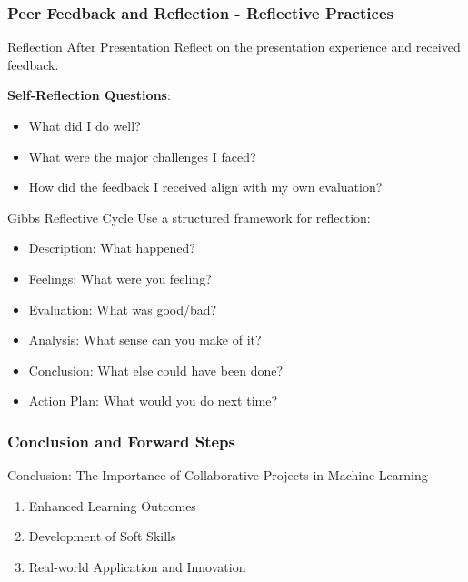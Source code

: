 \documentclass[aspectratio=169]{beamer}
\begin{document}
\begin{frame}[fragile]
    \frametitle{Peer Feedback and Reflection - Reflective Practices}
    
    \begin{block}{Reflection After Presentation}
        Reflect on the presentation experience and received feedback.
        
        \textbf{Self-Reflection Questions}:
        \begin{itemize}
            \item What did I do well?
            \item What were the major challenges I faced?
            \item How did the feedback I received align with my own evaluation?
        \end{itemize}
    \end{block}

    \begin{block}{Gibbs Reflective Cycle}
        Use a structured framework for reflection:
        \begin{itemize}
            \item Description: What happened?
            \item Feelings: What were you feeling?
            \item Evaluation: What was good/bad?
            \item Analysis: What sense can you make of it?
            \item Conclusion: What else could have been done?
            \item Action Plan: What would you do next time?
        \end{itemize}
    \end{block}
\end{frame}

\begin{frame}[fragile]
    \frametitle{Conclusion and Forward Steps}
    \begin{block}{Conclusion: The Importance of Collaborative Projects in Machine Learning}
        \begin{enumerate}
            \item Enhanced Learning Outcomes 
            \item Development of Soft Skills 
            \item Real-world Application and Innovation 
        \end{enumerate}
    \end{block}
\end{frame}
\end{document}
